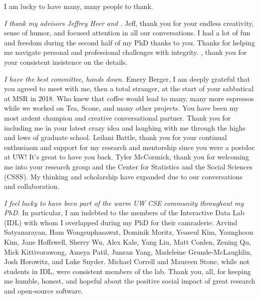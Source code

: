 \small
I am lucky to have many, many people to thank. 

\textit{I thank my advisors Jeffrey Heer and \reneJust.} Jeff, thank you for
your endless creativity, sense of humor, and focused attention in all our
conversations. I had a lot of fun and freedom during the second half of my PhD
thanks to you. Thanks for helping me navigate personal and professional challenges with integrity.
 \rene, thank you for your consistent insistence on the details.

\textit{I have the best committee, hands down.} Emery Berger, I am deeply grateful
that you agreed to meet with me, then a total stranger, at the start of your
sabbatical at MSR in 2018. Who knew that coffee would lead to many, many
more espressos while we worked on Tea, Scone, and many other projects. You have been my most ardent
champion and creative conversational partner. Thank you for including me in your latest crazy idea and laughing with me
through the highs and lows of graduate school. 
Leilani Battle, thank you for your continual enthusiasm and support for my
research and mentorship since you were a postdoc at UW! It's great to have you back.    
Tyler McCormick, thank you for welcoming me into your research group and the
Center for Statistics and the Social Sciences (CSSS). My thinking and
scholarship have expanded due to our conversations and collaboration. 

\textit{I feel lucky to have been part of the warm UW CSE community throughout
my PhD.} In particular, I am indebted to the members of the Interactive Data Lab
(IDL) with whom I overlapped during my PhD for their camraderie: Arvind
Satyanarayan, Ham Wongsuphasawat, Dominik Moritz, Yeaseul Kim, Younghoon Kim,
Jane Hoffswell, Sherry Wu, Alex Kale, Yang Liu, Matt Conlen, Zening Qu, Mick
Kittivorawong, Ameya Patil, Junran Yang, Madeleine Grunde-McLaughlin, Josh
Horowitz, and Luke Snyder. Michael Correll and Maureen Stone, while not students
in IDL, were consistent members of the lab. Thank you, all, for keeping me
humble, honest, and hopeful about the positive social impact of great research
and open-source software.

